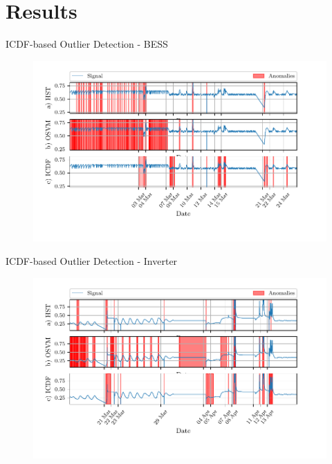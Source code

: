 \documentclass[aspectratio=169]{beamer}
\begin{document}
\section{Results}

\begin{frame}{ICDF-based Outlier Detection - BESS}
    \begin{figure}[htpb]
        \begin{center}
            \includegraphics[width=0.78\linewidth]{figures/Average_Cell_Temperature_sliding_compare_anomalies.pdf}
        \end{center}
    \end{figure}
\end{frame}

\begin{frame}{ICDF-based Outlier Detection - Inverter}
    \begin{figure}[htpb]
        \begin{center}
            \includegraphics[width=0.78\linewidth]{figures/Inverter_Temperature_sliding_compare_anomalies.pdf}
        \end{center}
    \end{figure}
\end{frame}
\end{document}

